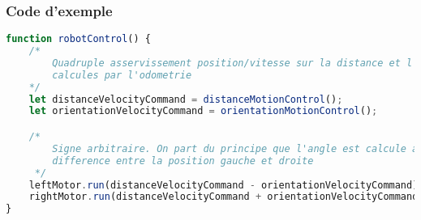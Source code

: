         \subsubsection{Code d'exemple}
            \begin{lstlisting}[language=JavaScript]
function robotControl() {
    /*
        Quadruple asservissement position/vitesse sur la distance et l'angle
        calcules par l'odometrie
    */
    let distanceVelocityCommand = distanceMotionControl();
    let orientationVelocityCommand = orientationMotionControl();

    /*
        Signe arbitraire. On part du principe que l'angle est calcule avec la
        difference entre la position gauche et droite
     */
    leftMotor.run(distanceVelocityCommand - orientationVelocityCommand);
    rightMotor.run(distanceVelocityCommand + orientationVelocityCommand);
}
            \end{lstlisting}
